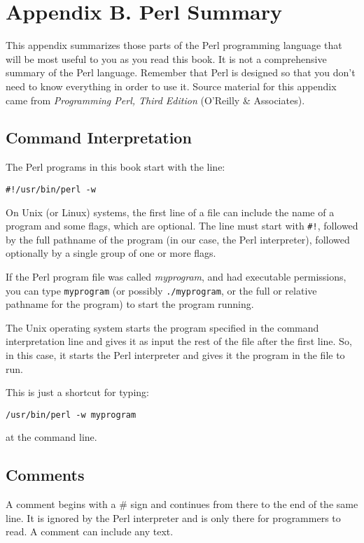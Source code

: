 \chapter{Appendix B. Perl Summary}
\label{chap:chapterab}
\minitoc

This appendix summarizes those parts of the Perl programming language that will be most useful to you as you read this book. It is not a comprehensive summary of the Perl language. Remember that Perl is designed so that you don't need to know everything in order to use it. Source material for this appendix came from \textit{Programming Perl, Third Edition} (O'Reilly \& Associates).

\section{Command Interpretation}
The Perl programs in this book start with the line:

\begin{lstlisting}
#!/usr/bin/perl -w
\end{lstlisting}

On Unix (or Linux) systems, the first line of a file can include the name of a program and some flags, which are optional. The line must start with \verb|#!|, followed by the full pathname of the program (in our case, the Perl interpreter), followed optionally by a single group of one or more flags.

If the Perl program file was called \textit{myprogram}, and had executable permissions, you can type \verb|myprogram| (or possibly \verb|./myprogram|, or the full or relative pathname for the program) to start the program running.

The Unix operating system starts the program specified in the command interpretation line and gives it as input the rest of the file after the first line. So, in this case, it starts the Perl interpreter and gives it the program in the file to run.

This is just a shortcut for typing:

\begin{lstlisting}
/usr/bin/perl -w myprogram 
\end{lstlisting}

at the command line.

\section{Comments}
A comment begins with a \# sign and continues from there to the end of the same line. It is ignored by the Perl interpreter and is only there for programmers to read. A comment can include any text.

